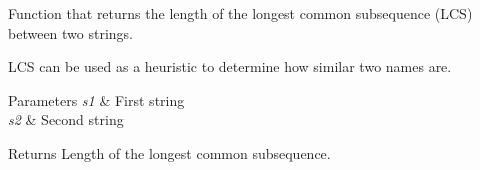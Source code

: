 Function that returns the length of the longest common subsequence (L\+CS) between two strings. 

L\+CS can be used as a heuristic to determine how similar two names are. 
\begin{DoxyParams}{Parameters}
{\em s1} & First string \\
\hline
{\em s2} & Second string \\
\hline
\end{DoxyParams}
\begin{DoxyReturn}{Returns}
Length of the longest common subsequence. 
\end{DoxyReturn}
